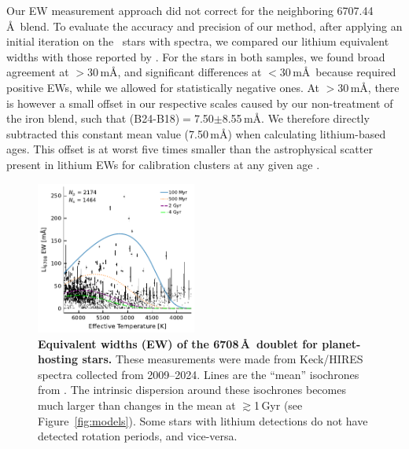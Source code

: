 \documentclass[11pt,twocolumn,tighten]{aastex63}
\begin{document}
Our EW measurement approach did not correct for the neighboring
 6707.44\,\AA\ blend.  To evaluate the accuracy and
precision of our method, after applying an initial iteration on the
\nlithiumstars\ stars with spectra, we compared our lithium equivalent
widths with those reported by \citet{2018ApJ...855..115B}.  For the
stars in both samples, we found broad agreement at $>$30\,m\AA, and
significant differences at $<$30\,m\AA\ because
\citet{2018ApJ...855..115B} required positive EWs, while we allowed
for statistically negative ones.  At $>$30\,m\AA, there is however a
small offset in our respective scales caused by our non-treatment of
the iron blend, such that (B24-B18)$=$7.50$\pm$8.55\,m\AA.  We
therefore directly subtracted this constant mean value (7.50\,m\AA)
when calculating lithium-based ages.  This offset is at worst five
times smaller than the astrophysical scatter present in lithium EWs
for calibration clusters at any given age
\citep[see][]{Jeffries_2023}.


\begin{figure}[!t]
	\begin{center}
		\leavevmode
		\includegraphics[width=0.47\textwidth]{li_vs_teff_koi_X_JUMP_eagles.pdf}
	\end{center}
	\vspace{-0.5cm}
	\caption{{\bf Equivalent widths (EW) of the  6708\,\AA\ doublet
    for planet-hosting stars.} These measurements were made from
    Keck/HIRES spectra collected from 2009--2024.  Lines are the ``mean''
    isochrones from \citet{Jeffries_2023}.  The intrinsic dispersion
    around these isochrones becomes much larger than changes in the
    mean at $\gtrsim$1\,Gyr (see Figure~\ref{fig:models}).  Some stars
    with lithium detections do not have detected rotation periods, and
    vice-versa.
		\label{fig:li_vs_teff}
	}
\end{figure}
\end{document}
